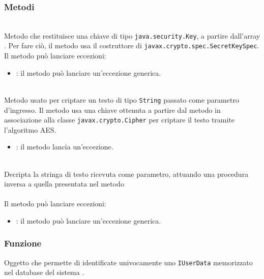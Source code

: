\subsubsection*{Metodi}
\begin{description}
	\item{}\\
	Metodo che restituisce una chiave di tipo \texttt{java.security.Key}, a partire dall'array . Per fare ciò, il metodo usa il costruttore di \texttt{javax.crypto.spec.SecretKeySpec}.
	Il metodo può lanciare eccezioni:
	\begin{itemize}
		\item {}: il metodo può lanciare un'eccezione generica.
	\end{itemize}
	\item{}\\
	Metodo usato per criptare un testo di tipo \texttt{String} passato come parametro d'ingresso. Il metodo usa una chiave ottenuta a partire dal metodo  in associazione alla classe \texttt{javax.crypto.Cipher} per criptare il testo tramite l'algoritmo AES.
	\begin{itemize}
		\item {}: il metodo lancia un'eccezione.
	\end{itemize}
	\item{}\\
	Decripta la stringa di testo ricevuta come parametro, attuando una procedura inversa a quella presentata nel metodo \\\\
	Il metodo può lanciare eccezioni:
	\begin{itemize}
		\item {}: il metodo può lanciare un'eccezione generica.
	\end{itemize}
\end{description}


\subsubsection*{Funzione}
Oggetto che permette di identificate univocamente uno \texttt{IUserData} memorizzato nel database del sistema \caName.

